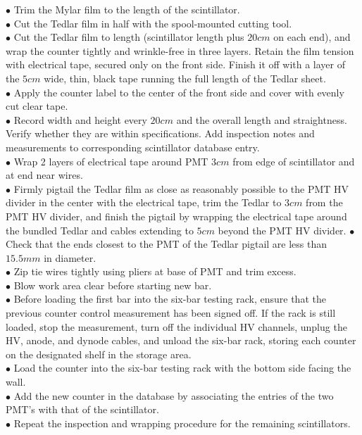 $\bullet$ Trim the Mylar film to the length of the scintillator.\\
$\bullet$ Cut the Tedlar film in half with the spool-mounted cutting tool.\\
$\bullet$ Cut the Tedlar film to length (scintillator length plus $20 cm$ on each end), and wrap the counter tightly and wrinkle-free in three layers. Retain the film tension with electrical tape, secured only on the front side. Finish it off with a layer of the $5 cm$ wide, thin, black tape running the full length of the Tedlar sheet.\\
$\bullet$ Apply the counter label to the center of the front side and cover with evenly cut clear tape.\\
$\bullet$ Record width and height every $20 cm$ and the overall length and straightness. Verify whether they are within specifications. Add inspection notes and measurements to corresponding scintillator database entry.\\
$\bullet$ Wrap 2 layers of electrical tape around PMT $3 cm$ from edge of scintillator and at end near wires.\\
$\bullet$ Firmly pigtail the Tedlar film as close as reasonably possible to the PMT HV divider in the center with the electrical tape, trim the Tedlar to $3 cm$ from the PMT HV divider, and finish the pigtail by wrapping the electrical tape around the bundled Tedlar and cables extending to $5 cm$ beyond the PMT HV divider.
$\bullet$ Check that the ends closest to the PMT of the Tedlar pigtail are less than $15.5mm$ in diameter.\\
$\bullet$ Zip tie wires tightly using pliers at base of PMT and trim excess.\\
$\bullet$ Blow work area clear before starting new bar.\\
$\bullet$ Before loading the first bar into the six-bar testing rack, ensure that the previous counter control measurement has been signed off. If the rack is still loaded, stop the measurement, turn off the individual HV channels, unplug the HV, anode, and dynode cables, and unload the six-bar rack, storing each counter on the designated shelf in the storage area.\\
$\bullet$ Load the counter into the six-bar testing rack with the bottom side facing the wall.\\
$\bullet$ Add the new counter in the database by associating the entries of the two PMT's
with that of the scintillator.\\
$\bullet$ Repeat the inspection and wrapping procedure for the remaining scintillators.

